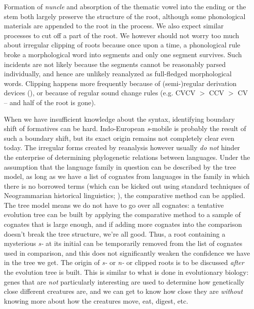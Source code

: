 \documentclass[a4paper, oneside, scheme=plain, 12pt]{article}
\newcommand*{\citepage}[1]{p.~{#1}}
\newcommand{\form}[1]{\emph{#1}}
\newcommand*{\textgt}{$>$ }
\begin{document}
Formation of \form{nuncle} and absorption of the thematic vowel into the ending or the stem
both largely preserve the structure of the root,
although some phonological materials are appended to the root in the process.
We also expect similar processes to cut off a part of the root.
We however should not worry too much about irregular clipping of roots
because once upon a time, a phonological rule broke a morphological word into segments
and only one segment survives.
Such incidents are not likely because the segments cannot be reasonably parsed individually,
and hence are unlikely reanalyzed as full-fledged morphological words.
Clipping happens more frequently because of (semi-)regular derivation devices
(),
or because of regular sound change rules
(e.g. CVCV \textgt CCV \textgt CV -- and half of the root is gone).

When we have insufficient knowledge about the syntax,
identifying boundary shift of formatives can be hard.
Indo-European \form{s}-mobile is probably the result of such a boundary shift,
but its exact origin remains not completely clear even today.
The irregular forms created by reanalysis however usually \emph{do not} hinder
the enterprise of determining phylogenetic relations between languages.
Under the assumption that the language family in question can be described by the tree model,
as long as we have \emph{a} list of cognates from languages in the family
in which there is no borrowed terms
(which can be kicked out using standard techniques of Neogrammarian historical linguistics;
\citealt[\citepage{3.5}]{campbell2013historical}),
the comparative method can be applied.
The tree model means we do not have to go over all cognates:
a tentative evolution tree can be built by
applying the comparative method to a sample of cognates that is large enough,
and if adding more cognates into the comparison doesn't break the tree structure, we're all good.
Thus, a root containing a mysterious \form{s-} at its initial can be 
temporarily removed from the list of cognates used in comparison,
and this does not significantly weaken the confidence we have in the tree we get.
The origin of \form{s-} or \form{n-} or clipped roots is to be discussed 
\emph{after} the evolution tree is built.
This is similar to what is done in evolutionary biology:
genes that are \emph{not} particularly interesting are used to determine how genetically close different creatures are,
and we can get to know how close they are \emph{without} knowing
more about how the creatures move, eat, digest, etc.
\end{document}

